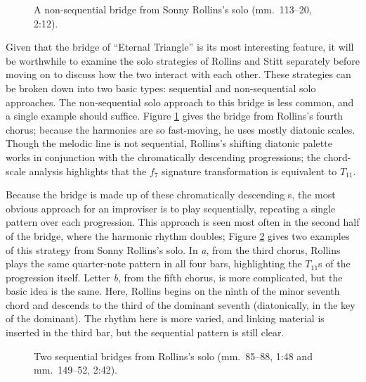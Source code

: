 \begin{figure}[tbp]
  \caption[A non-sequential bridge from Sonny Rollins's solo.]{%
    A non-sequential bridge from Sonny Rollins's solo (mm.~113--20, 2:12).}
  \label{et:sr-non-seq}
\end{figure}

Given that the bridge of ``Eternal Triangle'' is its most interesting feature,
it will be worthwhile to examine the solo strategies of Rollins and Stitt
separately before moving on to discuss how the two interact with each other.
These strategies can be broken down into two basic types: sequential and
non-sequential solo approaches. The non-sequential solo approach to this bridge
is less common, and a single example should suffice. Figure
\ref{et:sr-non-seq} gives the bridge from Rollins's fourth chorus;
because the harmonies are so fast-moving, he uses mostly diatonic scales.
Though the melodic line is not sequential, Rollins's
shifting diatonic palette works in conjunction with the chromatically
descending \tf progressions; the chord-scale analysis highlights
that the $f_7$ signature transformation is equivalent to $T_{11}$.

Because the bridge is made up of these chromatically descending \tf{}s, the most
obvious approach for an improviser is to play sequentially, repeating a single
pattern over each \tf progression. This approach is seen most often in the
second half of the bridge, where the harmonic rhythm doubles; Figure
\ref{et:sr-seq-bridge} gives two examples of this strategy from Sonny Rollins's
solo. In \emph{a}, from the third chorus, Rollins plays the same
quarter-note pattern in all four bars, highlighting the $T_{11}$s of the
progression itself. Letter \emph{b}, from the fifth chorus, is
more complicated, but the basic idea is the same. Here, Rollins begins on the
ninth of the minor seventh chord and descends to the third of the dominant
seventh (diatonically, in the key of the dominant). The rhythm here is more
varied, and linking material is inserted in the third bar, but the sequential
pattern is still clear.

\begin{figure}[tbp]
  \caption[Two sequential bridges from Rollins's solo.]{%
    Two sequential bridges from Rollins's solo (mm.~85--88, 1:48 and
    mm.~149--52, 2:42).}
  \label{et:sr-seq-bridge}
\end{figure}

